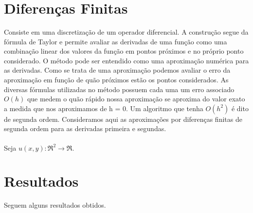 \documentclass[a4paper,11pt]{article}
\begin{document}
\section{Diferenças Finitas}

\paragraph{}Consiste em uma discretização de um operador diferencial. A construção segue da fórmula de Taylor e permite avaliar as derivadas de uma função como uma combinação linear dos valores da função em pontos próximos e no próprio ponto considerado. O método pode ser entendido como uma aproximação numérica para as derivadas. Como se trata de uma aproximação podemos avaliar o erro da aproximação em função de quão próximos estão os pontos considerados. As diversas fórmulas utilizadas no método possuem cada uma um erro associado $O(h)$ que medem o quão rápido nossa aproximação se aproxima do valor exato a medida que nos aproximamos de h = 0. Um algoritmo que tenha $O(h^2)$ é dito de segunda ordem. Consideramos aqui as aproximações por diferenças finitas de segunda ordem para as derivadas primeira e segundas.

\paragraph{}Seja $u(x,y):\Re^2 \longrightarrow \Re$. 


\section{Resultados}
\paragraph{}Seguem alguns resultados obtidos.

\begin{Gráfico}
	
\end{Gráfico}

\begin{Gráfico}
	
\end{Gráfico}

\begin{Gráfico}
	
\end{Gráfico}

\begin{Gráfico}
	
\end{Gráfico}
\end{document}

